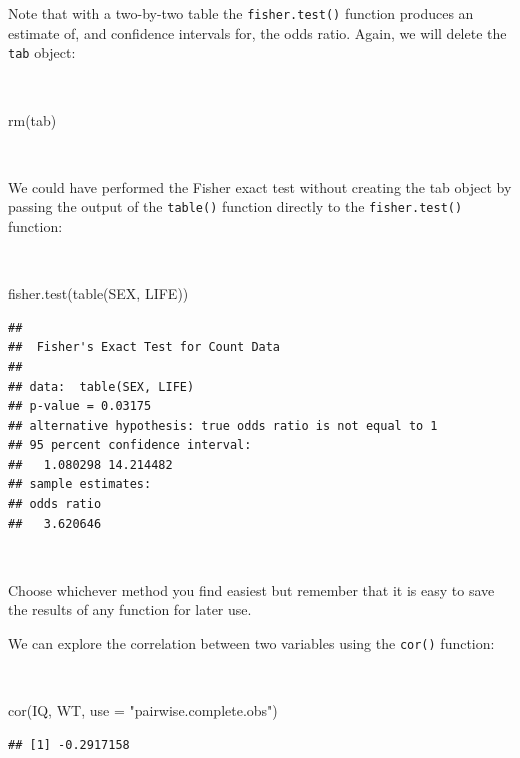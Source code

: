 \documentclass[
  12pt,
]{book}
\newenvironment{Shaded}{\begin{snugshade}}{\end{snugshade}}
\newcommand{\AttributeTok}[1]{\textcolor[rgb]{0.77,0.63,0.00}{#1}}
\newcommand{\FunctionTok}[1]{\textcolor[rgb]{0.00,0.00,0.00}{#1}}
\newcommand{\NormalTok}[1]{#1}
\newcommand{\StringTok}[1]{\textcolor[rgb]{0.31,0.60,0.02}{#1}}
\begin{document}
\newpage

Note that with a two-by-two table the \texttt{fisher.test()} function produces an estimate of, and confidence intervals for, the odds ratio. Again, we will delete the \texttt{tab} object:

~

\begin{Shaded}
\begin{Highlighting}[]
\FunctionTok{rm}\NormalTok{(tab)}
\end{Highlighting}
\end{Shaded}

~

We could have performed the Fisher exact test without creating the tab object by passing the output of the \texttt{table()} function directly to the \texttt{fisher.test()} function:

~

\begin{Shaded}
\begin{Highlighting}[]
\FunctionTok{fisher.test}\NormalTok{(}\FunctionTok{table}\NormalTok{(SEX, LIFE))}
\end{Highlighting}
\end{Shaded}

\begin{verbatim}
## 
##  Fisher's Exact Test for Count Data
## 
## data:  table(SEX, LIFE)
## p-value = 0.03175
## alternative hypothesis: true odds ratio is not equal to 1
## 95 percent confidence interval:
##   1.080298 14.214482
## sample estimates:
## odds ratio 
##   3.620646
\end{verbatim}

~

Choose whichever method you find easiest but remember that it is easy to save the results of any function for later use.

We can explore the correlation between two variables using the \texttt{cor()} function:

~

\begin{Shaded}
\begin{Highlighting}[]
\FunctionTok{cor}\NormalTok{(IQ, WT, }\AttributeTok{use =} \StringTok{"pairwise.complete.obs"}\NormalTok{)}
\end{Highlighting}
\end{Shaded}

\begin{verbatim}
## [1] -0.2917158
\end{verbatim}
\end{document}
